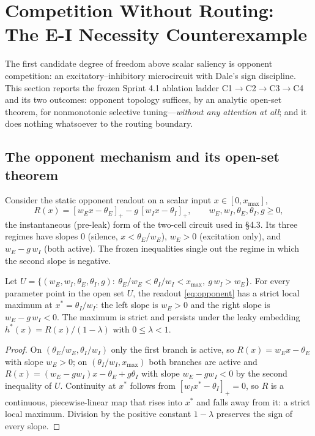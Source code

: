 \section{Competition Without Routing: The E-I Necessity Counterexample}
\label{sec:competition}

The first candidate degree of freedom above scalar saliency is opponent
competition: an excitatory--inhibitory microcircuit with Dale's sign
discipline. This section reports the frozen Sprint 4.1
ablation ladder C1$\to$C2$\to$C3$\to$C4 and its two outcomes: opponent
topology suffices, by an analytic open-set theorem, for nonmonotonic
selective tuning---\emph{without any attention at all}; and it does
nothing whatsoever to the routing boundary.

\subsection{The opponent mechanism and its open-set theorem}
\label{sec:opponent}

Consider the static opponent readout on a scalar input $x\in[0,x_{\max}]$,
\begin{equation}
R(x)=[w_E x-\theta_E]_+ - g\,[w_I x-\theta_I]_+,
\qquad w_E,w_I,\theta_E,\theta_I,g\ge0,
\label{eq:opponent}
\end{equation}
the instantaneous (pre-leak) form of the two-cell circuit used in §4.3.
Its three regimes have slopes $0$ (silence, $x<\theta_E/w_E$),
$w_E>0$ (excitation only), and $w_E-g\,w_I$ (both active). The frozen
inequalities single out the regime in which the second slope is negative.

\begin{theorem}[E-I nonmonotonicity]
\label{thm:EI}
Let
$U=\{(w_E,w_I,\theta_E,\theta_I,g):\ \theta_E/w_E<\theta_I/w_I<x_{\max},
\ g\,w_I>w_E\}$. For every parameter point in the open set $U$, the
readout \eqref{eq:opponent} has a strict local maximum at
$x^*=\theta_I/w_I$: the left slope is $w_E>0$ and the right slope is
$w_E-g\,w_I<0$. The maximum is strict and persists under the leaky
embedding $h^*(x)=R(x)/(1-\lambda)$ with $0\le\lambda<1$.
\end{theorem}

\begin{proof}
On $(\theta_E/w_E,\theta_I/w_I)$ only the first branch is active, so
$R(x)=w_E x-\theta_E$ with slope $w_E>0$; on
$(\theta_I/w_I,x_{\max})$ both branches are active and
$R(x)=(w_E-g w_I)x-\theta_E+g\theta_I$ with slope $w_E-g w_I<0$ by the
second inequality of $U$. Continuity at $x^*$ follows from
$[w_I x^*-\theta_I]_+=0$, so $R$ is a continuous, piecewise-linear map that
rises into $x^*$ and falls away from it: a strict local maximum. Division
by the positive constant $1-\lambda$ preserves the sign of every slope.
\end{proof}

